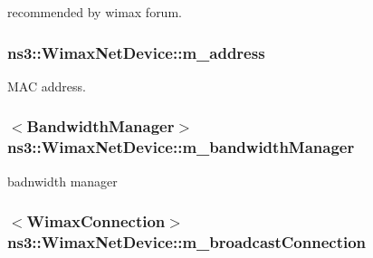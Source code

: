 recommended by wimax forum. 

\subsubsection[{\texorpdfstring{m\+\_\+address}{m_address}}]{ ns3\+::\+Wimax\+Net\+Device\+::m\+\_\+address\hspace{0.3cm}{\ttfamily [private]}}\hypertarget{classns3_1_1WimaxNetDevice_a1bceab06d8dd085392957fadeabb0a67}{}\label{classns3_1_1WimaxNetDevice_a1bceab06d8dd085392957fadeabb0a67}


M\+AC address. 

\subsubsection[{\texorpdfstring{m\+\_\+bandwidth\+Manager}{m_bandwidthManager}}]{$<${\bf Bandwidth\+Manager}$>$ ns3\+::\+Wimax\+Net\+Device\+::m\+\_\+bandwidth\+Manager\hspace{0.3cm}{\ttfamily [private]}}\hypertarget{classns3_1_1WimaxNetDevice_a109ed0791e501c8380b9d683d0412ac1}{}\label{classns3_1_1WimaxNetDevice_a109ed0791e501c8380b9d683d0412ac1}


badnwidth manager 

\subsubsection[{\texorpdfstring{m\+\_\+broadcast\+Connection}{m_broadcastConnection}}]{$<${\bf Wimax\+Connection}$>$ ns3\+::\+Wimax\+Net\+Device\+::m\+\_\+broadcast\+Connection\hspace{0.3cm}{\ttfamily [private]}}\hypertarget{classns3_1_1WimaxNetDevice_a601399b26a925d59e4161cf73bb354b0}{}\label{classns3_1_1WimaxNetDevice_a601399b26a925d59e4161cf73bb354b0}


